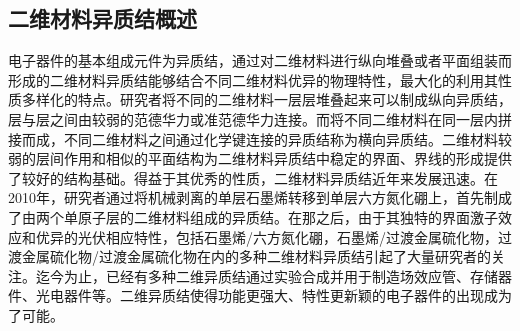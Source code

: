 \subsection{二维材料异质结概述}
    电子器件的基本组成元件为异质结，通过对二维材料进行纵向堆叠或者平面组装而形成的二维材料异质结能够结合不同二维材料优异的物理特性，最大化的利用其性质多样化的特点。研究者将不同的二维材料一层层堆叠起来可以制成纵向异质结，层与层之间由较弱的范德华力或准范德华力连接。而将不同二维材料在同一层内拼接而成，不同二维材料之间通过化学键连接的异质结称为横向异质结。二维材料较弱的层间作用和相似的平面结构为二维材料异质结中稳定的界面、界线的形成提供了较好的结构基础。得益于其优秀的性质，二维材料异质结近年来发展迅速。在2010年，研究者通过将机械剥离的单层石墨烯转移到单层六方氮化硼上，首先制成了由两个单原子层的二维材料组成的异质结。在那之后，由于其独特的界面激子效应和优异的光伏相应特性，包括石墨烯/六方氮化硼，石墨烯/过渡金属硫化物，过渡金属硫化物/过渡金属硫化物在内的多种二维材料异质结引起了大量研究者的关注。迄今为止，已经有多种二维异质结通过实验合成并用于制造场效应管、存储器件、光电器件等。二维异质结使得功能更强大、特性更新颖的电子器件的出现成为了可能。

